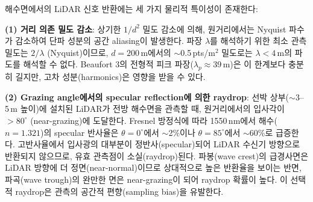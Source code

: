 \documentclass[11pt]{report}
\numberwithin{equation}{chapter}
\numberwithin{figure}{chapter}
\numberwithin{table}{chapter}
\begin{document}
해수면에서의 LiDAR 신호 반환에는 세 가지 물리적 특이성이 존재한다:

\textbf{(1) 거리 의존 밀도 감소}: 상기한 $1/d^2$ 밀도 감소에 의해,
원거리에서는 Nyquist 파수가 감소하여 단파 성분의 공간 aliasing이 발생한다.
파장 $\lambda$를 해석하기 위한 최소 관측 밀도는 $2/\lambda$ (Nyquist)이므로,
$d = 200$\,m에서의 $\sim$0.5\,pts/m$^2$ 밀도로는
$\lambda < 4$\,m의 파도를 해석할 수 없다.
Beaufort 3의 전형적 피크 파장($\lambda_p \approx 39$\,m)은
이 한계보다 충분히 길지만, 고차 성분(harmonics)은 영향을 받을 수 있다.

\textbf{(2) Grazing angle에서의 specular reflection에 의한 raydrop}:
선박 상부($\sim$3--5\,m 높이)에 설치된 LiDAR가 전방 해수면을 관측할 때,
원거리에서의 입사각이 $> 80^\circ$ (near-grazing)에 도달한다.
Fresnel 방정식에 따라 1550\,nm에서 해수($n = 1.321$)의 specular 반사율은
$\theta = 0^\circ$에서 $\sim$2\%이나 $\theta = 85^\circ$에서 $\sim$60\%로 급증한다.
고반사율에서 입사광의 대부분이 정반사(specular)되어 LiDAR 수신기 방향으로
반환되지 않으므로, 유효 관측점이 소실(raydrop)된다.
파봉(wave crest)의 급경사면은 LiDAR 방향에 더 정면(near-normal)이므로
상대적으로 높은 반환율을 보이는 반면,
파곡(wave trough)의 완만한 면은 near-grazing이 되어 raydrop 확률이 높다.
이 선택적 raydrop은 관측의 공간적 편향(sampling bias)을 유발한다.
\end{document}
